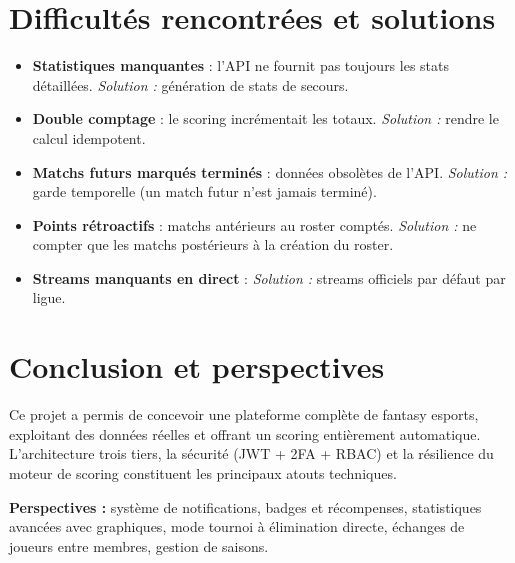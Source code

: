 \documentclass[12pt,a4paper]{report}
\begin{document}
\chapter{Difficultés rencontrées et solutions}
\begin{itemize}
  \item \textbf{Statistiques manquantes} : l'API ne fournit pas toujours les stats
        détaillées. \textit{Solution :} génération de stats de secours.
  \item \textbf{Double comptage} : le scoring incrémentait les totaux.
        \textit{Solution :} rendre le calcul idempotent.
  \item \textbf{Matchs futurs marqués terminés} : données obsolètes de l'API.
        \textit{Solution :} garde temporelle (un match futur n'est jamais terminé).
  \item \textbf{Points rétroactifs} : matchs antérieurs au roster comptés.
        \textit{Solution :} ne compter que les matchs postérieurs à la création du roster.
  \item \textbf{Streams manquants en direct} : \textit{Solution :} streams officiels
        par défaut par ligue.
\end{itemize}

\chapter{Conclusion et perspectives}
Ce projet a permis de concevoir une plateforme complète de fantasy esports,
exploitant des données réelles et offrant un scoring entièrement automatique.
L'architecture trois tiers, la sécurité (JWT + 2FA + RBAC) et la résilience du
moteur de scoring constituent les principaux atouts techniques.

\textbf{Perspectives :} système de notifications, badges et récompenses,
statistiques avancées avec graphiques, mode tournoi à élimination directe,
échanges de joueurs entre membres, gestion de saisons.
\end{document}
